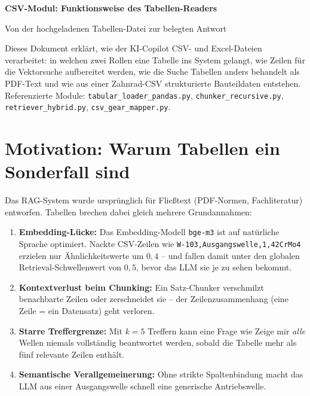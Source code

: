 \documentclass[12pt, a4paper]{article}
\begin{document}
\begin{center}
  {\LARGE\bfseries\color{accentblue} CSV-Modul: Funktionsweise des Tabellen-Readers\par}
  \vspace{0.3cm}
  {\large\color{accentgray} Von der hochgeladenen Tabellen-Datei zur belegten Antwort\par}
  \vspace{0.6cm}
\end{center}

\begin{tcolorbox}[colback=boxbg, colframe=boxframe]
  Dieses Dokument erklärt, wie der KI-Copilot CSV- und Excel-Dateien verarbeitet:
  in welchen zwei Rollen eine Tabelle ins System gelangt, wie Zeilen für die
  Vektorsuche aufbereitet werden, wie die Suche Tabellen anders behandelt als
  PDF-Text und wie aus einer Zahnrad-CSV strukturierte Bauteildaten entstehen.
  Referenzierte Module: \texttt{tabular\_loader\_pandas.py},
  \texttt{chunker\_recursive.py}, \texttt{retriever\_hybrid.py},
  \texttt{csv\_gear\_mapper.py}.
\end{tcolorbox}

\tableofcontents
\newpage

\section{Motivation: Warum Tabellen ein Sonderfall sind}

Das RAG-System wurde ursprünglich für Fließtext (PDF-Normen, Fachliteratur)
entworfen. Tabellen brechen dabei gleich mehrere Grundannahmen:

\begin{enumerate}[itemsep=2pt]
  \item \textbf{Embedding-Lücke:} Das Embedding-Modell \texttt{bge-m3} ist auf
        natürliche Sprache optimiert. Nackte CSV-Zeilen wie
        \texttt{W-103,Ausgangswelle,1,42CrMo4} erzielen nur Ähnlichkeitswerte
        um $0{,}4$ -- und fallen damit unter den globalen Retrieval-Schwellenwert
        von $0{,}5$, bevor das LLM sie je zu sehen bekommt.
  \item \textbf{Kontextverlust beim Chunking:} Ein Satz-Chunker verschmilzt
        benachbarte Zeilen oder zerschneidet sie -- der Zeilenzusammenhang
        (\glqq eine Zeile = ein Datensatz\grqq) geht verloren.
  \item \textbf{Starre Treffergrenze:} Mit $k=5$ Treffern kann eine Frage wie
        \glqq Zeige mir \emph{alle} Wellen\grqq{} niemals vollständig beantwortet
        werden, sobald die Tabelle mehr als fünf relevante Zeilen enthält.
  \item \textbf{Semantische Verallgemeinerung:} Ohne strikte Spaltenbindung
        macht das LLM aus einer \glqq Ausgangswelle\grqq{} schnell eine
        generische \glqq Antriebswelle\grqq.
\end{enumerate}
\end{document}
